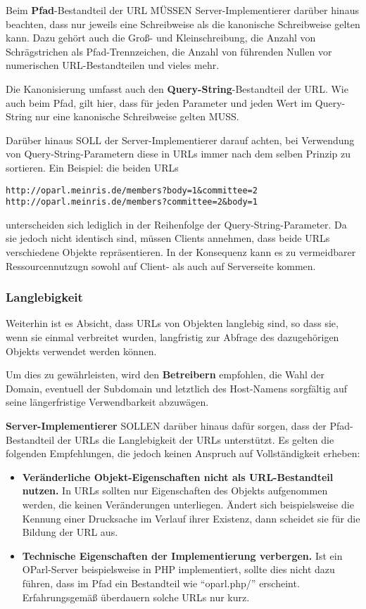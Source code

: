 \documentclass[,a4paper]{article}
\begin{document}
Beim \textbf{Pfad}-Bestandteil der URL MÜSSEN Server-Implementierer
darüber hinaus beachten, dass nur jeweils eine Schreibweise als die
kanonische Schreibweise gelten kann. Dazu gehört auch die Groß- und
Kleinschreibung, die Anzahl von Schrägstrichen als Pfad-Trennzeichen,
die Anzahl von führenden Nullen vor numerischen URL-Bestandteilen und
vieles mehr.

Die Kanonisierung umfasst auch den \textbf{Query-String}-Bestandteil der
URL. Wie auch beim Pfad, gilt hier, dass für jeden Parameter und jeden
Wert im Query-String nur eine kanonische Schreibweise gelten MUSS.

Darüber hinaus SOLL der Server-Implementierer darauf achten, bei
Verwendung von Query-String-Parametern diese in URLs immer nach dem
selben Prinzip zu sortieren. Ein Beispiel: die beiden URLs

\begin{verbatim}
http://oparl.meinris.de/members?body=1&committee=2
http://oparl.meinris.de/members?committee=2&body=1
\end{verbatim}

unterscheiden sich lediglich in der Reihenfolge der
Query-String-Parameter. Da sie jedoch nicht identisch sind, müssen
Clients annehmen, dass beide URLs verschiedene Objekte repräsentieren.
In der Konsequenz kann es zu vermeidbarer Ressourcennutzugn sowohl auf
Client- als auch auf Serverseite kommen.

\subsubsection{Langlebigkeit}\label{langlebigkeit}

Weiterhin ist es Absicht, dass URLs von Objekten langlebig sind, so dass
sie, wenn sie einmal verbreitet wurden, langfristig zur Abfrage des
dazugehörigen Objekts verwendet werden können.

Um dies zu gewährleisten, wird den \textbf{Betreibern} empfohlen, die
Wahl der Domain, eventuell der Subdomain und letztlich des Host-Namens
sorgfältig auf seine längerfristige Verwendbarkeit abzuwägen.

\textbf{Server-Implementierer} SOLLEN darüber hinaus dafür sorgen, dass
der Pfad-Bestandteil der URLs die Langlebigkeit der URLs unterstützt. Es
gelten die folgenden Empfehlungen, die jedoch keinen Anspruch auf
Vollständigkeit erheben:

\begin{itemize}
\item
  \textbf{Veränderliche Objekt-Eigenschaften nicht als URL-Bestandteil
  nutzen.} In URLs sollten nur Eigenschaften des Objekts aufgenommen
  werden, die keinen Veränderungen unterliegen. Ändert sich
  beispielsweise die Kennung einer Drucksache im Verlauf ihrer Existenz,
  dann scheidet sie für die Bildung der URL aus.
\item
  \textbf{Technische Eigenschaften der Implementierung verbergen.} Ist
  ein OParl-Server beispielsweise in PHP implementiert, sollte dies
  nicht dazu führen, dass im Pfad ein Bestandteil wie ``oparl.php/''
  erscheint. Erfahrungsgemäß überdauern solche URLs nur kurz.
\end{itemize}
\end{document}
